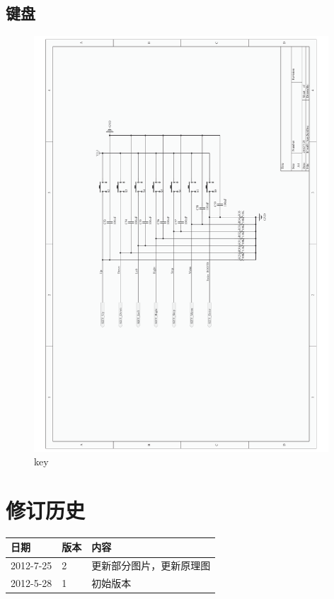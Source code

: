 \documentclass[titlepage]{article}
\begin{document}
 \subsection{键盘}
  \begin{figure}[ht]
  \centering
 \includegraphics[width=11cm]{key.pdf}
 \caption{key}
 \end{figure}



 \newpage
 \section{修订历史}

  \begin{table}[h]
  \centering
  \begin{tabular}{|l|l|l|}
  \hline
  日期 & 版本 &  内容\\
  \hline
  2012-7-25 & 2 & 更新部分图片，更新原理图\\
  \hline
  2012-5-28 & 1 &  初始版本\\
  \hline
  \end{tabular}
  \end{table}
\end{document}
